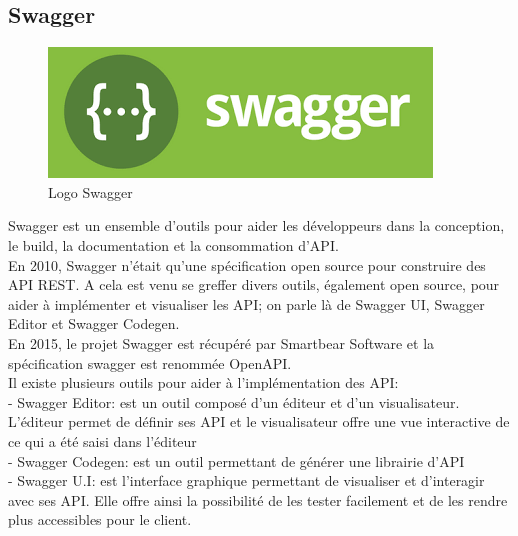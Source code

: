 \documentclass[a4paper, 12pt]{report}
\begin{document}
\subsection{Swagger}
\begin{figure}[H]
    \centering
    \includegraphics[width = 0.5\linewidth]{img/swagger.png}
    \caption{Logo Swagger}
\end{figure}\cite{swagger}
Swagger est un ensemble d’outils pour aider les développeurs dans la conception, le
build, la documentation et la consommation d’API.\\
En 2010, Swagger n’était qu’une spécification open source pour construire des API
REST. A cela est venu se greffer divers outils, également open source, pour aider à
implémenter et visualiser les API; on parle là de Swagger UI, Swagger Editor et Swagger
Codegen.\\
En 2015, le projet Swagger est récupéré par Smartbear Software et la spécification
swagger est renommée OpenAPI.\\
Il existe plusieurs outils pour aider à l’implémentation des API:\\
- Swagger Editor: est un outil composé d’un éditeur et d’un visualisateur.\\
L’éditeur permet de définir ses API et le visualisateur offre une vue interactive
de ce qui a été saisi dans l’éditeur\\
- Swagger Codegen: est un outil permettant de générer une librairie d’API\\
- Swagger U.I: est l’interface graphique permettant de visualiser et d’interagir
avec ses API. Elle offre ainsi la possibilité de les tester facilement et de les
rendre plus accessibles pour le client.
\end{document}
